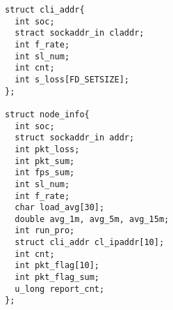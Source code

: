 \begin{verbatim}
struct cli_addr{
  int soc;
  stract sockaddr_in claddr;
  int f_rate;
  int sl_num;
  int cnt;
  int s_loss[FD_SETSIZE];
};

struct node_info{
  int soc;
  struct sockaddr_in addr;
  int pkt_loss;
  int pkt_sum;
  int fps_sum;
  int sl_num;
  int f_rate;
  char load_avg[30];
  double avg_1m, avg_5m, avg_15m;
  int run_pro;
  struct cli_addr cl_ipaddr[10];
  int cnt;
  int pkt_flag[10];
  int pkt_flag_sum;
  u_long report_cnt;
};

\end{verbatim}
